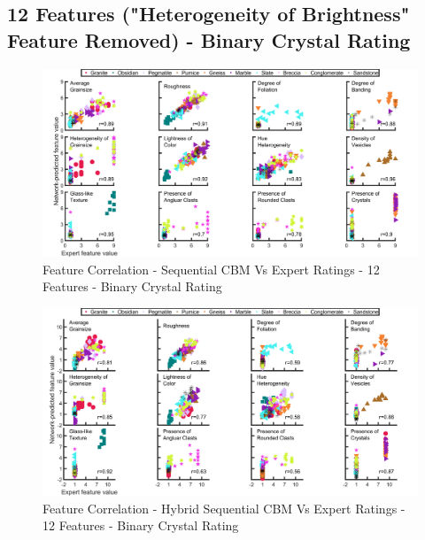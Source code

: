 \subsection{12 Features ("Heterogeneity of Brightness" Feature Removed) - Binary Crystal Rating}

\begin{figure}[H]
  \centering
    \includegraphics[width=\textwidth]{images/MATLAB Correlation - C2_Vs_Expert - 12 Feautres - Binary.png}
    \caption{Feature Correlation - Sequential CBM Vs Expert Ratings - 12 Features - Binary Crystal Rating} \label{fig:Feature Correlation - Sequential CBM Vs Expert Ratings - 12 Features - Binary Crystal Rating}
\end{figure}

\begin{figure}[H]
  \centering
    \includegraphics[width=\textwidth]{images/MATLAB Correlation - Hybrid_Vs_Expert - 12 Feautres - Binary.png}
    \caption{Feature Correlation - Hybrid Sequential CBM Vs Expert Ratings - 12 Features - Binary Crystal Rating} \label{fig:Feature Correlation - Hybrid Sequential CBM Vs Expert Ratings - 12 Features - Binary Crystal Rating}
\end{figure}

